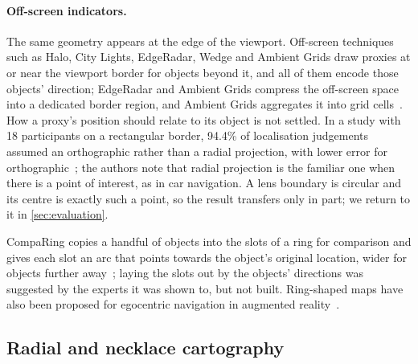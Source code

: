 \paragraph{Off-screen indicators.} The same geometry appears at the edge of the
viewport. Off-screen techniques such as Halo, City Lights, EdgeRadar, Wedge and
Ambient Grids draw proxies at or near the viewport border for objects beyond it,
and all of them encode those objects' direction; EdgeRadar and Ambient Grids
compress the off-screen space into a dedicated border region, and Ambient Grids
aggregates it into grid cells~\cite{baudisch2003halo,zellweger2003citylights,
gustafson2007edgeradar,gustafson2008wedge,jackle2015ambient,jackle2017topology}.
How a proxy's position should relate to its object is not settled. In a study
with 18 participants on a rectangular border, 94.4\% of localisation judgements
assumed an orthographic rather than a radial projection, with lower error for
orthographic~\cite{jackle2017topology}; the authors note that radial projection is
the familiar one when there is a point of interest, as in car navigation. A lens
boundary is circular and its centre is exactly such a point, so the result
transfers only in part; we return to it in \cref{sec:evaluation}.

CompaRing copies a handful of objects into the slots of a ring for comparison and
gives each slot an arc that points towards the object's original location, wider
for objects further away~\cite{tominski2016comparing}; laying the slots out by
the objects' directions was suggested by the experts it was shown to, but not
built. Ring-shaped maps have also been proposed for egocentric navigation in
augmented reality~\cite{danyluk2026ringmaps}.

\subsection{Radial and necklace cartography}

